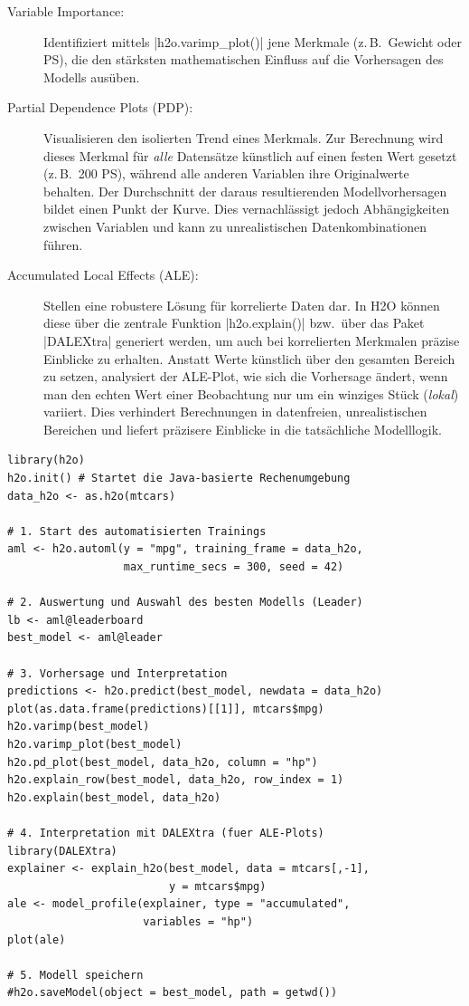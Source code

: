 \documentclass[10pt,twocolumn]{scrartcl}
\renewcommand{\lstinline}{\mycoloredinline}
\begin{document}
\begin{description}
\item[Variable Importance:] Identifiziert mittels \lstinline|h2o.varimp_plot()| jene Merkmale (z.\,B.\ Gewicht oder PS), die den stärksten mathematischen Einfluss auf die Vorhersagen des Modells ausüben.
\item[Partial Dependence Plots (PDP):] Visualisieren den isolierten Trend eines Merkmals. Zur Berechnung wird dieses Merkmal für \emph{alle} Datensätze künstlich auf einen festen Wert gesetzt (z.\,B.\ 200 PS), während alle anderen Variablen ihre Originalwerte behalten. Der Durchschnitt der daraus resultierenden Modellvorhersagen bildet einen Punkt der Kurve. Dies vernachlässigt jedoch Abhängigkeiten zwischen Variablen und kann zu unrealistischen Datenkombinationen führen.
\item[Accumulated Local Effects (ALE):] Stellen eine robustere Lösung für korrelierte Daten dar. In H2O können diese über die zentrale Funktion \lstinline|h2o.explain()| bzw.\ über das Paket \lstinline|DALEXtra| generiert werden, um auch bei korrelierten Merkmalen präzise Einblicke zu erhalten. Anstatt Werte künstlich über den gesamten Bereich zu setzen, analysiert der ALE-Plot, wie sich die Vorhersage ändert, wenn man den echten Wert einer Beobachtung nur um ein winziges Stück (\emph{lokal}) variiert. Dies verhindert Berechnungen in datenfreien, unrealistischen Bereichen und liefert präzisere Einblicke in die tatsächliche Modelllogik.
\end{description}

\begin{lstlisting}
library(h2o)
h2o.init() # Startet die Java-basierte Rechenumgebung
data_h2o <- as.h2o(mtcars)

# 1. Start des automatisierten Trainings
aml <- h2o.automl(y = "mpg", training_frame = data_h2o, 
                  max_runtime_secs = 300, seed = 42)

# 2. Auswertung und Auswahl des besten Modells (Leader)
lb <- aml@leaderboard      
best_model <- aml@leader   

# 3. Vorhersage und Interpretation
predictions <- h2o.predict(best_model, newdata = data_h2o)
plot(as.data.frame(predictions)[[1]], mtcars$mpg)
h2o.varimp(best_model)
h2o.varimp_plot(best_model)
h2o.pd_plot(best_model, data_h2o, column = "hp")
h2o.explain_row(best_model, data_h2o, row_index = 1) 
h2o.explain(best_model, data_h2o)

# 4. Interpretation mit DALEXtra (fuer ALE-Plots)
library(DALEXtra)
explainer <- explain_h2o(best_model, data = mtcars[,-1],
                         y = mtcars$mpg)
ale <- model_profile(explainer, type = "accumulated",
                     variables = "hp")
plot(ale)

# 5. Modell speichern
#h2o.saveModel(object = best_model, path = getwd())
\end{lstlisting}
\end{document}
